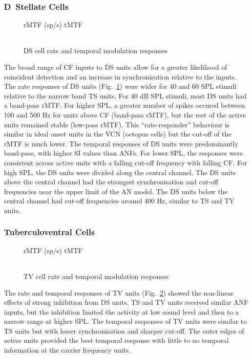 \subsubsection{D~Stellate Cells}
\begin{figure}[tb]
\centering 
\caption{DS cell rate and temporal modulation responses}\label{fig:DS}
{\hspace{0.2\columnwidth}rMTF (sp/s) \hspace{0.35\columnwidth} tMTF}\\
\\
\end{figure}
The broad range of CF inputs to DS units allow for a greater
likelihood of coincident detection and an increase in
synchronisation relative to the inputs.  The rate responses of DS
units (Fig.~\ref{fig:DS}) were wider for 40 and 60 SPL stimuli
relative to the narrow band TS units.  For 40 dB SPL stimuli, most
DS units had a band-pass rMTF. For higher SPL, a greater number of
spikes occured between 100 and 500 Hz for units above CF (band-pass
rMTF), but the rest of the active units remained stable (low-pass
rMTF). This ``rate-responder'' behaviour is similar in ideal onset
units in the VCN (octopus cells) but the cut-off of the rMTF is much
lower. The temporal responses of DS units were predominantly
band-pass, with higher SI values than ANFs.  For lower SPL, the
responses were consistent across active units with a falling cut-off
frequency with falling CF. For high SPL, the DS units were divided
along the central channel.  The DS units above the central channel
had the strongest synchronisation and cut-off frequencies near the
upper limit of the AN model.  The DS units below the central
channel had cut-off frequencies around 400 Hz, similar to TS and TV
units.

\subsubsection{Tuberculoventral Cells}
\begin{figure}[tb]
\centering 
\caption{TV cell rate and temporal modulation responses}\label{fig:TV}
{\hspace{0.2\columnwidth}rMTF (sp/s) \hspace{0.35\columnwidth} tMTF}\\
\\
\end{figure}
The rate and temporal responses of TV units (Fig.~\ref{fig:TV})
showed the non-linear effects of strong inhibition from DS
units. TS and TV units received similar ANF inputs, but the
inhibition limited the activity at low sound level and then to a
narrow range at higher SPL.  The temporal responses of TV units
were similar to TS units but with lesser synchronisation and
sharper cut-off.  The outer edges of active units provided the best
temporal response with little to no temporal information at the
carrier frequency units.



